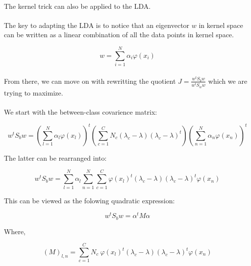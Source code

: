 \paragraph{}
The kernel trick can also be applied to the LDA.

\paragraph{}
The key to adapting the LDA is to notice that an eigenvector $w$ in kernel space can be written as a
linear combination of all the data points in kernel space.

\begin{equation}
\label{phibase}
w = \sum_{i=1}^N \alpha_i \varphi(x_i)
\end{equation}

\paragraph{}
From there, we can move on with rewritting the quotient $J = \frac{w^tS_bw}{w^tS_ww}$ which we are
trying to maximize.

\paragraph{}
We start with the between-class covarience matrix:

\begin{equation*}
w^tS_bw = \left( \sum_{l=1}^N \alpha_l \varphi(x_l)\right)^t
            \left( \sum_{c=1}^C N_c(\lambda_c - \lambda)(\lambda_c - \lambda)^t\right)
            \left( \sum_{n=1}^N \alpha_n \varphi(x_n)\right)^t 
\end{equation*}

The latter can be rearranged into:

\begin{equation*}
w^tS_bw = \sum_{l=1}^N\alpha_l \sum_{n=1}^N \sum_{c =1}^C 
                \varphi(x_l)^t(\lambda_c - \lambda)(\lambda_c - \lambda)^t\varphi(x_n)
\end{equation*}

This can be viewed as the folowing quadratic expression:

\begin{equation*}
w^tS_bw = \alpha^tM\alpha
\end{equation*}

Where,

\begin{equation*}
(M)_{l,n} = \sum_{c=1}^C N_c ~\varphi(x_l)^t (\lambda_c - \lambda)(\lambda_c -\lambda)^t
\varphi(x_n)
\end{equation*}

